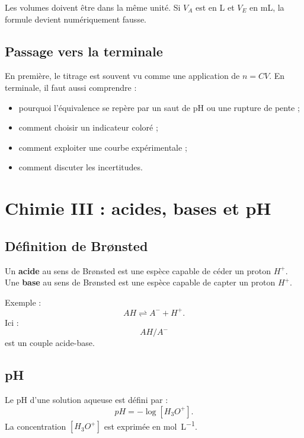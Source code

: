 \documentclass[11pt,a4paper]{article}
\begin{document}
\begin{alerte}
Les volumes doivent être dans la même unité.  
Si $V_A$ est en L et $V_E$ en mL, la formule devient numériquement fausse.
\end{alerte}

\subsection{Passage vers la terminale}

\begin{transition}
En première, le titrage est souvent vu comme une application de $n=CV$.  
En terminale, il faut aussi comprendre :
\begin{itemize}
  \item pourquoi l'équivalence se repère par un saut de pH ou une rupture de pente ;
  \item comment choisir un indicateur coloré ;
  \item comment exploiter une courbe expérimentale ;
  \item comment discuter les incertitudes.
\end{itemize}
\end{transition}

\section{Chimie III : acides, bases et pH}

\subsection{Définition de Brønsted}

\begin{definition}
Un \textbf{acide} au sens de Brønsted est une espèce capable de céder un proton $H^+$.  
Une \textbf{base} au sens de Brønsted est une espèce capable de capter un proton $H^+$.
\end{definition}

Exemple :
\[
AH \rightleftharpoons A^-+H^+.
\]
Ici :
\[
AH/A^-
\]
est un couple acide-base.

\subsection{pH}

\begin{definition}
Le pH d'une solution aqueuse est défini par :
\[
pH=-\log[H_3O^+].
\]
La concentration $[H_3O^+]$ est exprimée en \si{mol.L^{-1}}.
\end{definition}
\end{document}
